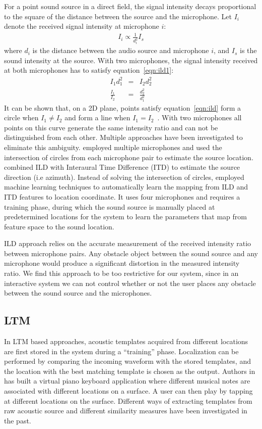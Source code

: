 For a point sound source in a direct field, the signal intensity decays proportional to the square of the distance between the source and the microphone. Let $I_i$ denote the received signal intensity at microphone $i$: 
\begin{eqnarray}\label{eqn:ild1}
I_i \propto \frac{1}{d_i^2} I_s
\end{eqnarray}
where $d_i$ is the distance between the audio source and microphone $i$, and $I_s$ is the sound intensity at the source.
With two microphones, the signal intensity received at both microphones has to satisfy equation~\ref{eqn:ild1}:
\begin{eqnarray}
I_1d_1^2 &=& I_2d_2^2\\
\label{eqn:ild}
\frac{I_1}{I_2} &=& \frac{d_2^2}{d_1^2}
\end{eqnarray}
It can be shown that, on a 2D plane, points satisfy equation~\ref{eqn:ild} form a circle when $I_1 \ne I_2$ and form a line when $I_1 = I_2$~\cite{ild:1}. With two microphones all points on this curve generate the same intensity ratio and can not be distinguished from each other. Multiple approaches have been investigated to eliminate this ambiguity. \cite{ild:1} employed multiple microphones and used the intersection of circles from each microphone pair to estimate the source location. \cite{ild:3} combined ILD with Interaural Time Difference (ITD) to estimate the source direction (i.e azimuth). Instead of solving the intersection of circles, \cite{ild:4} employed machine learning techniques to automatically learn the mapping from ILD and ITD features to location coordinate. It uses four microphones and requires a training phase, during which the sound source is manually placed at predetermined locations for the system to learn the parameters that map from feature space to the sound location.

ILD approach relies on the accurate measurement of the received intensity ratio between microphone pairs. Any obstacle object between the sound source and any microphone would produce a significant distortion in the measured intensity ratio. We find this approach to be too restrictive for our system, since in an interactive system we can not control whether or not the user places any obstacle between the sound source and the microphones.

\subsection{LTM}
In LTM based approaches, acoustic templates acquired from different locations are first stored in the system during a ``training'' phase. Localization can be performed by comparing the incoming waveform with the stored templates, and the location with the best matching template is chosen as the output. Authors in \cite{extended:tusi} has built a virtual piano keyboard application where different musical notes are associated with different locations on a surface. A user can then play by tapping at different locations on the surface. Different ways of extracting templates from raw acoustic source and different similarity measures have been investigated in the past. 

